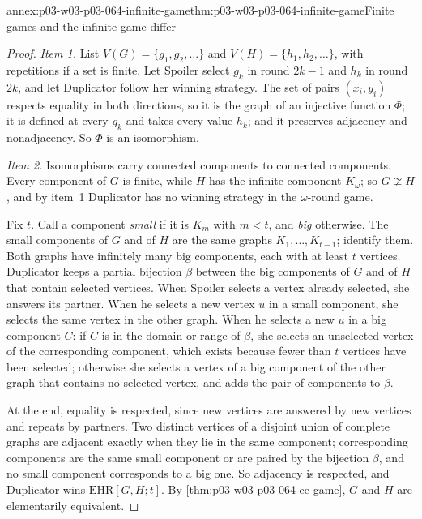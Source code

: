 \begin{annexitem}{annex:p03-w03-p03-064-infinite-game}{thm:p03-w03-p03-064-infinite-game}{Finite games and the infinite game differ}
\begin{proof}
\emph{Item 1.}  List \(V(G)=\{g_1,g_2,\ldots\}\) and
\(V(H)=\{h_1,h_2,\ldots\}\), with repetitions if a set is finite.  Let
Spoiler select \(g_k\) in round \(2k-1\) and \(h_k\) in round \(2k\), and let
Duplicator follow her winning strategy.  The set of pairs \((x_i,y_i)\)
respects equality in both directions, so it is the graph of an injective
function \(\Phi\); it is defined at every \(g_k\) and takes every value
\(h_k\); and it preserves adjacency and nonadjacency.  So \(\Phi\) is an
isomorphism.

\emph{Item 2.}  Isomorphisms carry connected components to connected
components.  Every component of \(G\) is finite, while \(H\) has the infinite
component \(K_\omega\); so \(G\not\cong H\), and by item~1 Duplicator has no
winning strategy in the \(\omega\)-round game.

Fix \(t\).  Call a component \emph{small} if it is \(K_m\) with \(m<t\), and
\emph{big} otherwise.  The small components of \(G\) and of \(H\) are the same
graphs \(K_1,\ldots,K_{t-1}\); identify them.  Both graphs have infinitely
many big components, each with at least \(t\) vertices.  Duplicator keeps a
partial bijection \(\beta\) between the big components of \(G\) and of \(H\)
that contain selected vertices.  When Spoiler selects a vertex already
selected, she answers its partner.  When he selects a new vertex \(u\) in a
small component, she selects the same vertex in the other graph.  When he
selects a new \(u\) in a big component \(C\): if \(C\) is in the domain or
range of \(\beta\), she selects an unselected vertex of the corresponding
component, which exists because fewer than \(t\) vertices have been selected;
otherwise she selects a vertex of a big component of the other graph that
contains no selected vertex, and adds the pair of components to \(\beta\).

At the end, equality is respected, since new vertices are answered by new
vertices and repeats by partners.  Two distinct vertices of a disjoint union
of complete graphs are adjacent exactly when they lie in the same component;
corresponding components are the same small component or are paired by the
bijection \(\beta\), and no small component corresponds to a big one.  So
adjacency is respected, and Duplicator wins \(\mathrm{EHR}[G,H;t]\).  By
\cref{thm:p03-w03-p03-064-ee-game}, \(G\) and \(H\) are elementarily
equivalent.
\end{proof}
\end{annexitem}


